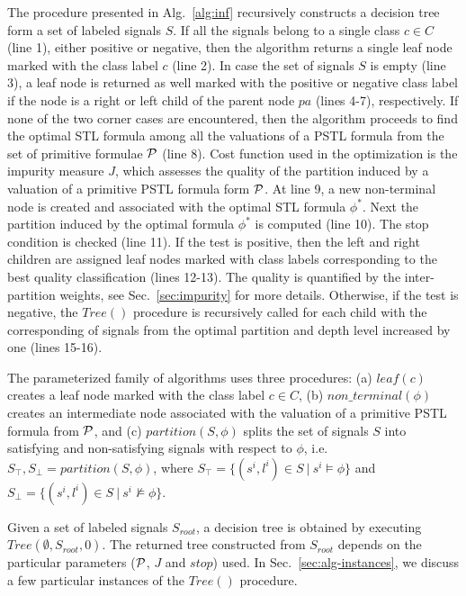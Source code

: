 The procedure presented in Alg.~\ref{alg:inf}
recursively constructs a decision tree form a
set of labeled signals $S$.
If all the signals belong to a single class $c\in C$ (line 1),
either positive or negative, then the
algorithm returns a single leaf node marked
with the class label $c$ (line 2).
In case the set of signals $S$ is empty (line 3),
a leaf node is returned as well marked with
the positive or negative class label if the node
is a right or left child of the parent node $pa$
(lines 4-7), respectively.
If none of the two corner cases are encountered,
then the algorithm proceeds to find the optimal
STL formula among all the valuations of a PSTL
formula from the set of primitive formulae
$\mathcal{P}$ (line 8).
Cost function used in the optimization is the
impurity measure $J$, which assesses the quality
of the partition induced by a valuation of a
primitive PSTL formula form $\mathcal{P}$.
At line 9, a new non-terminal node is created
and associated with the optimal STL formula
$\phi^*$.
Next the partition induced by the optimal
formula $\phi^*$ is computed (line 10).
The stop condition is checked (line 11).
If the test is positive, then the left
and right children are assigned leaf
nodes marked with class labels corresponding
to the best quality classification (lines 12-13).
The quality is quantified by the
inter-partition weights, see Sec.~\ref{sec:impurity}
for more details.
Otherwise, if the test is negative, the $Tree()$
procedure is recursively called for each child
with the corresponding of signals from the
optimal partition and depth level increased by one
(lines 15-16).

The parameterized family of algorithms uses
three procedures: (a) $leaf(c)$ creates
a leaf node marked with the class label $c \in C$,
(b) $non\_terminal(\phi)$ creates an
intermediate node associated with the
valuation of a primitive PSTL formula from $\mathcal{P}$,
and (c) $partition(S, \phi)$ splits the set
of signals $S$ into satisfying and non-satisfying
signals with respect to $\phi$, i.e.
$S_\top, S_\perp = partition(S, \phi)$, where
$S_\top = \{(s^i, l^i) \in S \ |\ s^i \models \phi \}$
and
$S_\perp = \{(s^i, l^i) \in S \ |\ s^i \not\models \phi \}$.

Given a set of labeled signals $S_{root}$, a
decision tree is obtained by executing
$Tree(\emptyset, S_{root}, 0)$.
The returned tree constructed from $S_{root}$
depends on the particular parameters ($\mathcal{P}$,
$J$ and $stop$) used.
In Sec.~\ref{sec:alg-instances}, we discuss
a few particular instances of the $Tree()$
procedure.

